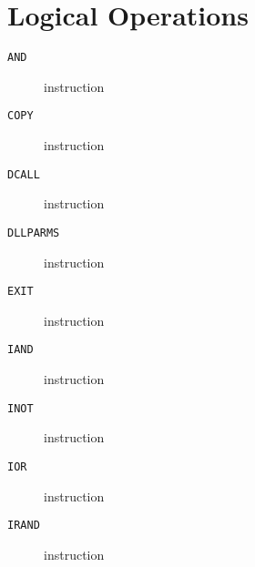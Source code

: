 \section{Logical Operations}
\begin{description}
\item[\texttt{AND}] instruction\\

\end{description}
\clearpage
\begin{description}
\item[\texttt{COPY}] instruction\\

\end{description}
\clearpage
\begin{description}
\item[\texttt{DCALL}] instruction\\

\end{description}
\clearpage
\begin{description}
\item[\texttt{DLLPARMS}] instruction\\

\end{description}
\clearpage
\begin{description}
\item[\texttt{EXIT}] instruction\\

\end{description}
\clearpage
\begin{description}
\item[\texttt{IAND}] instruction\\

\end{description}
\clearpage
\begin{description}
\item[\texttt{INOT}] instruction\\

\end{description}
\clearpage
\begin{description}
\item[\texttt{IOR}] instruction\\

\end{description}
\clearpage
\begin{description}
\item[\texttt{IRAND}] instruction\\

\end{description}
